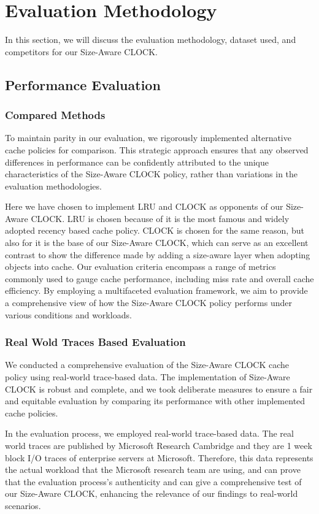 \documentclass[journal,10.5pt,onecolumn]{IEEEtran}
\begin{document}
\section{Evaluation Methodology}
In this section, we will discuss the evaluation methodology, dataset used, and competitors for our Size-Aware CLOCK.

\subsection{Performance Evaluation}
\subsubsection{Compared Methods}
To maintain parity in our evaluation, we rigorously implemented alternative cache policies for comparison. This strategic approach ensures that any observed differences in performance can be confidently attributed to the unique characteristics of the Size-Aware CLOCK policy, rather than variations in the evaluation methodologies.

Here we have chosen to implement LRU and CLOCK as opponents of our Size-Aware CLOCK. LRU is chosen because of it is the most famous and widely adopted recency based cache policy. CLOCK is chosen for the same reason, but also for it is the base of our Size-Aware CLOCK, which can serve as an excellent contrast to show the difference made by adding a size-aware layer when adopting objects into cache. Our evaluation criteria encompass a range of metrics commonly used to gauge cache performance, including miss rate and overall cache efficiency. By employing a multifaceted evaluation framework, we aim to provide a comprehensive view of how the Size-Aware CLOCK policy performs under various conditions and workloads.

\subsubsection{Real Wold Traces Based Evaluation}
We conducted a comprehensive evaluation of the Size-Aware CLOCK cache policy using real-world trace-based data. The implementation of Size-Aware CLOCK is robust and complete, and we took deliberate measures to ensure a fair and equitable evaluation by comparing its performance with other implemented cache policies.

In the evaluation process, we employed real-world trace-based data. The real world traces are published by Microsoft Research Cambridge and they are 1 week block I/O traces of enterprise servers at Microsoft. Therefore, this data represents the actual workload that the Microsoft research team are using, and can prove that the evaluation process's authenticity and can give a comprehensive test of our Size-Aware CLOCK, enhancing the relevance of our findings to real-world scenarios.
\end{document}
